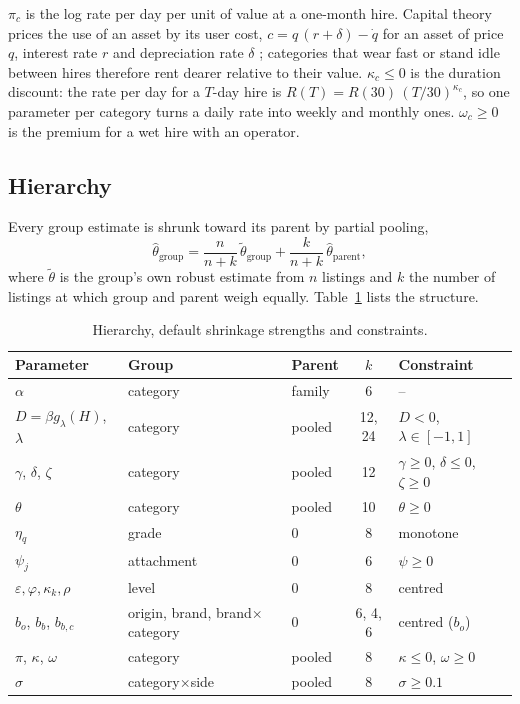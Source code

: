 \documentclass[11pt]{article}
\begin{document}
$\pi_c$ is the log rate per day per unit of value at a one-month hire. Capital theory prices the use
of an asset by its user cost, $c = q\,(r + \delta) - \dot q$ for an asset of price $q$, interest
rate $r$ and depreciation rate $\delta$ \citep{jorgenson1963,hall1967}; categories that wear fast or
stand idle between hires therefore rent dearer relative to their value. $\kappa_c\le0$ is the
duration discount: the rate per day for a $T$-day hire is $R(T) = R(30)\,(T/30)^{\kappa_c}$, so one
parameter per category turns a daily rate into weekly and monthly ones. $\omega_c\ge0$ is the
premium for a wet hire with an operator.

\subsection{Hierarchy}
Every group estimate is shrunk toward its parent by partial pooling,
\begin{equation}
\hat\theta_{\text{group}} = \frac{n}{n+k}\,\tilde\theta_{\text{group}} + \frac{k}{n+k}\,\hat\theta_{\text{parent}},
\end{equation}
where $\tilde\theta$ is the group's own robust estimate from $n$ listings and $k$ the number of
listings at which group and parent weigh equally. Table~\ref{tab:hierarchy} lists the structure.

\begin{table}[t]
\centering\small
\caption{Hierarchy, default shrinkage strengths and constraints.}
\label{tab:hierarchy}
\begin{tabular}{lllcl}
\toprule
Parameter & Group & Parent & $k$ & Constraint \\
\midrule
$\alpha$ & category & family & 6 & -- \\
$D=\beta g_\lambda(H)$, $\lambda$ & category & pooled & 12, 24 & $D<0$, $\lambda\in[-1,1]$ \\
$\gamma$, $\delta$, $\zeta$ & category & pooled & 12 & $\gamma\ge0$, $\delta\le0$, $\zeta\ge0$ \\
$\theta$ & category & pooled & 10 & $\theta\ge0$ \\
$\eta_q$ & grade & 0 & 8 & monotone \\
$\psi_j$ & attachment & 0 & 6 & $\psi\ge0$ \\
$\varepsilon,\varphi,\kappa_k,\rho$ & level & 0 & 8 & centred \\
$b_o$, $b_b$, $b_{b,c}$ & origin, brand, brand$\times$category & 0 & 6, 4, 6 & centred ($b_o$) \\
$\pi$, $\kappa$, $\omega$ & category & pooled & 8 & $\kappa\le0$, $\omega\ge0$ \\
$\sigma$ & category$\times$side & pooled & 8 & $\sigma\ge0.1$ \\
\bottomrule
\end{tabular}
\end{table}
\end{document}
